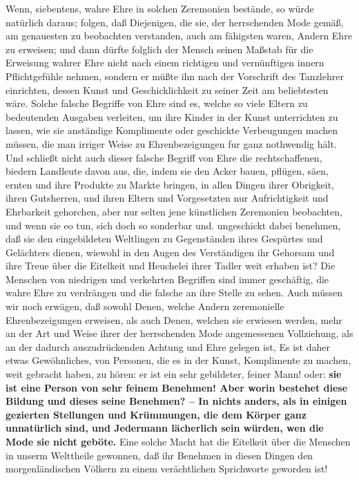 Wenn, siebentens, wahre Ehre in solchen Zeremonien bestände, so würde natürlich
daraus; folgen, daß Diejenigen, die sie, der herrschenden Mode gemäß, am
genauesten zu beobachten verstanden, auch am fähigsten waren, Andern Ehre zu
erweisen; und dann dürfte folglich der Mensch seinen Maßstab für die Erweisung
wahrer Ehre nicht nach einem richtigen und vernünftigen innern Pflichtgefühle
nehmen, sondern er müßte ihn nach der Vorschrift des Tanzlehrer einrichten,
dessen Kunst und Geschicklichkeit zu seiner Zeit am beliebtesten wäre. Solche
falsche Begriffe von Ehre sind es, welche so viele Eltern
zu bedeutenden
Ausgaben verleiten, um ihre Kinder in der Kunst unterrichten zu lassen, wie sie
anständige Komplimente oder geschickte Verbeugungen machen müssen, die man
irriger Weise zu Ehrenbezeigungen fur ganz nothwendig hält.
 Und schließt nicht
auch dieser falsche Begriff von Ehre die rechtschaffenen, biedern Landleute
davon aus, die, indem sie den Acker bauen, pflügen, säen, ernten und ihre
Produkte zu Markte bringen, in allen Dingen ihrer Obrigkeit, ihren Gutsherren,
und ihren Eltern und Vorgesetzten nur Aufrichtigkeit und Ehrbarkeit gehorchen,
aber nur selten jene künstlichen Zeremonien beobachten, und wenn sie eo tun,
sich doch so sonderbar und. ungeschickt dabei benehmen, daß sie den
eingebildeten Weltlingen zu Gegenständen ihres Gespürtes und Gelächters dienen,
wiewohl in den Augen des Verständigen ihr Gehorsam und ihre Treue über die
Eitelkeit und Heuchelei ihrer Tadler weit erhaben ist? Die Menschen von
niedrigen und verkehrten Begriffen sind immer geschäftig, die wahre Ehre zu
verdrängen und die falsche an ihre Stelle zu sehen. Auch müssen wir noch
erwägen, daß sowohl Denen, welche Andern zeremonielle Ehrenbezeigungen erweisen,
als auch Denen, welchen sie erwiesen werden, mehr an der Art und Weise ihrer der
herrschenden Mode angemessenen Vollziehung, als an der dadurch auszudrückenden
Achtung und Ehre gelegen ist, Es ist daher etwas Gewöhnliches, von Personen, die
es in der Kunst, Komplimente zu machen, weit gebracht haben, zu hören: er ist
ein sehr gebildeter, feiner Mann! oder: \textbf{sie ist
eine Person von sehr feinem
Benehmen! Aber worin bestehet diese Bildung und dieses seine Benehmen? -- In
nichts anders, als in einigen gezierten Stellungen und Krümmungen, die dem
Körper ganz unnatürlich sind, und Jedermann lächerlich sein würden, wen die Mode
sie nicht geböte.} Eine solche Macht hat die Eitelkeit über die Menschen in
unserm Welttheile gewonnen, daß ihr Benehmen in diesen Dingen den
morgenländischen Völkern zu einem verächtlichen Sprichworte geworden ist!

